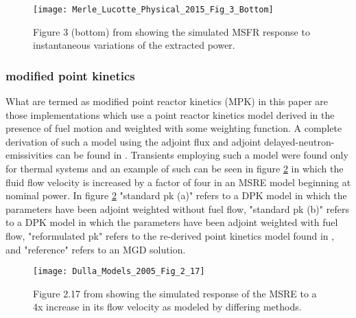 \documentclass[review]{elsarticle}
\begin{document}
\begin{figure}[h]
   \centering
   \texttt{[image: Merle\_Lucotte\_Physical\_2015\_Fig\_3\_Bottom]}
   \caption{Figure 3 (bottom) from \cite{merle-lucotte_physical_2015} showing the simulated MSFR
   response to instantaneous variations of the extracted power.} 
   \label{fig:lucotte_ipk}
\end{figure}

\subsubsection{modified point kinetics} \label{sssec:mpk}
What are termed as
modified point reactor kinetics (MPK) in this paper are those implementations
which use a point reactor kinetics model derived in the presence of fuel motion
and weighted with some weighting function. A complete derivation of such a
model using the adjoint flux and adjoint delayed-neutron-emissivities can be
found in \cite{dulla_models_2005}. Transients employing such a model were found
only for thermal systems and an example of such can be seen in figure 
\ref{fig:dulla_4x_flow} in which the fluid flow velocity is increased by a factor
of four in an MSRE model beginning at nominal power.
In figure \ref{fig:dulla_4x_flow} "standard pk (a)" refers
to a DPK model in which the parameters have been adjoint weighted without fuel
flow, "standard pk (b)" refers to a DPK model in which the parameters have
been adjoint weighted with fuel flow, "reformulated pk" refers to the re-derived
point kinetics model found in \cite{dulla_models_2005}, and "reference" refers
to an MGD solution.

\begin{figure}[h]
   \centering
   \texttt{[image: Dulla\_Models\_2005\_Fig\_2\_17]}
   \caption{Figure 2.17 from \cite{dulla_models_2005} showing the simulated response of the MSRE
   to a 4x increase in its flow velocity as modeled by differing methods.} 
   \label{fig:dulla_4x_flow}
\end{figure}
\end{document}
